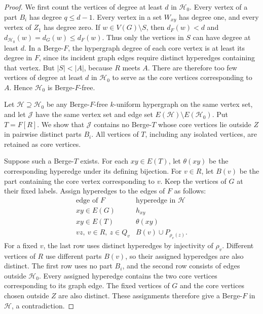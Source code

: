 \documentclass[10pt,a4paper]{article}
\numberwithin{equation}{section}
\theoremstyle{definition}
\theoremstyle{plain}
\newcommand{\HH}{\mathcal H}
\newcommand{\JJ}{\mathcal J}
\begin{document}
\begin{proof}
We first count the vertices of degree at least $d$ in $\HH_0$.
Every vertex of a part $B_i$ has degree $q\le d-1$.
Every vertex in a set $W_{xy}$ has degree one, and every vertex of
$Z_1$ has degree zero. If $w\in V(G)\setminus S$, then $d_F(w)<d$
and $d_{\HH_0}(w)=d_G(w)\le d_F(w)$. Thus only the vertices in $S$
can have degree at least $d$.
In a Berge-$F$, the hypergraph degree of each core vertex is at least
its degree in $F$, since its incident graph edges require distinct
hyperedges containing that vertex. But $|S|<|A|$, because $R$ meets
$A$. There are therefore too few vertices of degree at least $d$ in
$\HH_0$ to serve as the core vertices corresponding to $A$.
Hence $\HH_0$ is Berge-$F$-free.

Let $\HH\supseteq\HH_0$ be any Berge-$F$-free $k$-uniform hypergraph
on the same vertex set, and let $\JJ$ have the same vertex set and
edge set $E(\HH)\setminus E(\HH_0)$. Put $T=F[R]$.
We show that $\JJ$ contains no Berge-$T$ whose core vertices lie
outside $Z$ in pairwise distinct parts $B_i$. All vertices of $T$,
including any isolated vertices, are retained as core vertices.

Suppose such a Berge-$T$ exists. For each $xy\in E(T)$, let
$\theta(xy)$ be the corresponding hyperedge under its defining
bijection. For $v\in R$, let $B(v)$ be the part containing the core
vertex corresponding to $v$. Keep the vertices of $G$ at their fixed
labels. Assign hyperedges to the edges of $F$ as follows:
\begin{equation}\label{eq:edge-assignment}
 \begin{array}{c|l}
 \text{edge of }F&\text{hyperedge in }\HH\\ \hline
 xy\in E(G)&h_{xy}\\
 xy\in E(T)&\theta(xy)\\
 vz,\ v\in R,\ z\in Q_v&B(v)\cup P_{\rho_v(z)}.
 \end{array}
\end{equation}
For a fixed $v$, the last row uses distinct hyperedges by injectivity
of $\rho_v$. Different vertices of $R$ use different parts $B(v)$,
so their assigned hyperedges are also distinct.
The first row uses no part $B_i$, and the second row consists of
edges outside $\HH_0$. Every assigned hyperedge contains the two
core vertices corresponding to its graph edge. The fixed vertices
of $G$ and the core vertices chosen outside $Z$ are also distinct.
These assignments therefore give a Berge-$F$ in $\HH$, a contradiction.


\end{proof}
\end{document}
